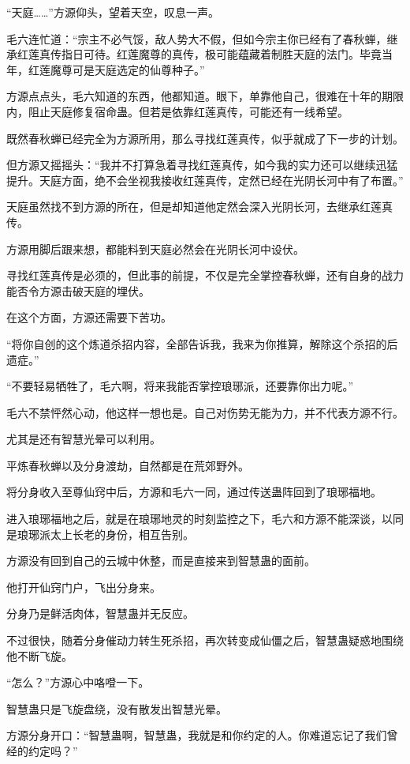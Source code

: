 \begin{this_body}
“天庭……”方源仰头，望着天空，叹息一声。

毛六连忙道：“宗主不必气馁，敌人势大不假，但如今宗主你已经有了春秋蝉，继承红莲真传指日可待。红莲魔尊的真传，极可能蕴藏着制胜天庭的法门。毕竟当年，红莲魔尊可是天庭选定的仙尊种子。”

方源点点头，毛六知道的东西，他都知道。眼下，单靠他自己，很难在十年的期限内，阻止天庭修复宿命蛊。但若是依靠红莲真传，可能还有一线希望。

既然春秋蝉已经完全为方源所用，那么寻找红莲真传，似乎就成了下一步的计划。

但方源又摇摇头：“我并不打算急着寻找红莲真传，如今我的实力还可以继续迅猛提升。天庭方面，绝不会坐视我接收红莲真传，定然已经在光阴长河中有了布置。”

天庭虽然找不到方源的所在，但是却知道他定然会深入光阴长河，去继承红莲真传。

方源用脚后跟来想，都能料到天庭必然会在光阴长河中设伏。

寻找红莲真传是必须的，但此事的前提，不仅是完全掌控春秋蝉，还有自身的战力能否令方源击破天庭的埋伏。

在这个方面，方源还需要下苦功。

“将你自创的这个炼道杀招内容，全部告诉我，我来为你推算，解除这个杀招的后遗症。”

“不要轻易牺牲了，毛六啊，将来我能否掌控琅琊派，还要靠你出力呢。”

毛六不禁怦然心动，他这样一想也是。自己对伤势无能为力，并不代表方源不行。

尤其是还有智慧光晕可以利用。

平炼春秋蝉以及分身渡劫，自然都是在荒郊野外。

将分身收入至尊仙窍中后，方源和毛六一同，通过传送蛊阵回到了琅琊福地。

进入琅琊福地之后，就是在琅琊地灵的时刻监控之下，毛六和方源不能深谈，以同是琅琊派太上长老的身份，相互告别。

方源没有回到自己的云城中休整，而是直接来到智慧蛊的面前。

他打开仙窍门户，飞出分身来。

分身乃是鲜活肉体，智慧蛊并无反应。

不过很快，随着分身催动力转生死杀招，再次转变成仙僵之后，智慧蛊疑惑地围绕他不断飞旋。

“怎么？”方源心中咯噔一下。

智慧蛊只是飞旋盘绕，没有散发出智慧光晕。

方源分身开口：“智慧蛊啊，智慧蛊，我就是和你约定的人。你难道忘记了我们曾经的约定吗？”


\end{this_body}

